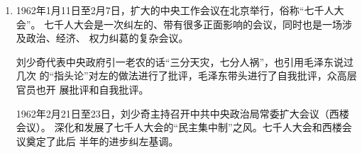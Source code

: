 {\begin{enumerate}
\begin{quotation}
    （出台一系列此类政策之后，）1958年1月9日，全国人民代表大会常务委员会第九
    十一次会议通过并颁布了新中国第一部户籍制度《中华人民共和国户口登记条
    例》……正式确立了户口迁移审批制度和凭证落户制度。以这个条例为标志，中国
    政府开始对人口自由流动实行严格限制和政府管制……第一次明确将城乡居民区分
    为“农业户口”和“非农业户口”两种不同户籍。严格限制农村农民迁往城镇，限
    制城市间人口流动，在城市与农村之间构筑了一道高墙，城乡分离的“二元经济模
    式”因此而生成。

    户籍制度变化第二阶段：(1958年-1978年)，这一时期包括大跃进、三年困难时期和
    十年“文革”。严格限制户口迁移，特别是严格限制农民向城市迁移，控制农村人
    口流人城市，压缩城市人口，包括精简职工、知识青年上山下乡、干部下放农村等，
    出现了人类历史上罕见的人口\textbf{从城市迁往农村的反向运动}，形成了一整套严格的户
    籍管理制度。\cite{quxiaohuji}
  \end{quotation}

  精简职工方面，
  \begin{quotation}
    （大跃进时期的大招工）使得工人数从1957年的3101万增加到1960年的5969万，增
    长92.5\%。职工人数的增加，特别是从农村招收的职工，给城镇带来了大批的人
    口，1957-1960年间，中国的城镇人口从9949万增加到13073万，其中由农村迁入城
    镇的大约2218万。

    当粮食危机越来越严重时候，许多城市已经面临几乎没有库存的窘境，1960年底全
    国82个大中城市的库存粮食只有正常水平的 $\sfrac{1}{3}$ 。1960年6月北京、天
    津和辽宁的几个主要城市的库存粮食几乎没有，只能维持不到10天的供应，上海的
    大米库存已经没有，天天告急。

    有关的统计，在1961-1963年间，压缩下放2500万城镇人口，精减职工1833万人，被
    精减的职工中，大部分也被下放到农村，少数转为城镇集体企业工人，还有少数流
    浪到边疆地区，在当地谋生。\cite{jingjianzhigong}
  \end{quotation}

\item 1962年1月11日至2月7日，扩大的中央工作会议在北京举行，俗称“七千人大会”。
  七千人大会是一次纠左的、带有很多正面影响的会议，同时也是一场涉及政治、经济、
  权力纠葛的复杂会议。

  刘少奇代表中央政府引一老农的话“三分天灾，七分人祸”，也引用毛泽东说过几次
  的“指头论”对左的做法进行了批评，毛泽东带头进行了自我批评，众高层官员也开
  展批评和自我批评。

  1962年2月21日至23日，刘少奇主持召开中共中央政治局常委扩大会议（西楼会议）。
  深化和发展了七千人大会的“民主集中制”之风。七千人大会和西楼会议奠定了此后
  半年的进步纠左基调。


\end{enumerate}}
